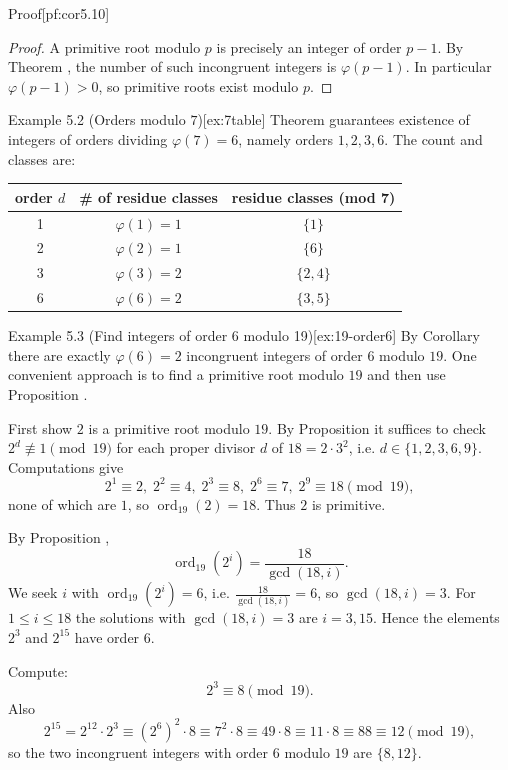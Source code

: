 \documentclass[10pt]{article}
\theoremstyle{definition}
\theoremstyle{plain}
\numberwithin{equation}{section}
\begin{document}
\begin{define}{Proof}[pf:cor5.10]
\begin{proof}
A primitive root modulo $p$ is precisely an integer of order $p-1$. By Theorem , the number of such incongruent integers is $\varphi(p-1)$. In particular $\varphi(p-1)>0$, so primitive roots exist modulo $p$.
\end{proof}
\end{define}

\begin{define}{Example 5.2 (Orders modulo $7$)}[ex:7table]
Theorem  guarantees existence of integers of orders dividing $\varphi(7)=6$, namely orders $1,2,3,6$. The count and classes are:

\medskip
\begin{center}
\begin{tabular}{c|c|c}
order $d$ & \# of residue classes & residue classes (mod 7) \\ \hline
1 & $\varphi(1)=1$ & $\{1\}$ \\
2 & $\varphi(2)=1$ & $\{6\}$ \\
3 & $\varphi(3)=2$ & $\{2,4\}$ \\
6 & $\varphi(6)=2$ & $\{3,5\}$
\end{tabular}
\end{center}
\end{define}

\begin{define}{Example 5.3 (Find integers of order 6 modulo 19)}[ex:19-order6]
By Corollary  there are exactly $\varphi(6)=2$ incongruent integers of order $6$ modulo $19$. One convenient approach is to find a primitive root modulo $19$ and then use Proposition .

First show $2$ is a primitive root modulo $19$. By Proposition  it suffices to check $2^d\not\equiv1\pmod{19}$ for each proper divisor $d$ of $18=2\cdot3^2$, i.e. $d\in\{1,2,3,6,9\}$. Computations give
\[
2^1\equiv2,\;2^2\equiv4,\;2^3\equiv8,\;2^6\equiv7,\;2^9\equiv 18\pmod{19},
\]
none of which are $1$, so $\operatorname{ord}_{19}(2)=18$. Thus $2$ is primitive.

By Proposition ,
\[
\operatorname{ord}_{19}(2^i)=\frac{18}{\gcd(18,i)}.
\]
We seek $i$ with $\operatorname{ord}_{19}(2^i)=6$, i.e. $\frac{18}{\gcd(18,i)}=6$, so $\gcd(18,i)=3$. For $1\le i\le 18$ the solutions with $\gcd(18,i)=3$ are $i=3,15$. Hence the elements $2^3$ and $2^{15}$ have order $6$.

Compute:
\[
2^3\equiv 8\pmod{19}.
\]
Also
\[
2^{15} = 2^{12}\cdot 2^3 \equiv (2^{6})^{2}\cdot 8 \equiv 7^2\cdot 8 \equiv 49\cdot 8 \equiv 11\cdot 8 \equiv 88 \equiv 12\pmod{19},
\]
so the two incongruent integers with order $6$ modulo $19$ are $\{8,12\}$.
\end{define}
\end{document}

